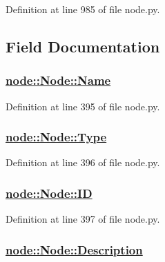 Definition at line 985 of file node.py.

\subsection{Field Documentation}
\hypertarget{classnode_1_1Node_b5fcb10e9efa5cebbd8a1b001ef0e936}{
\subsubsection[Name]{\setlength{\rightskip}{0pt plus 5cm}\hyperlink{classnode_1_1Node_b5fcb10e9efa5cebbd8a1b001ef0e936}{node::Node::Name}}}
\label{classnode_1_1Node_b5fcb10e9efa5cebbd8a1b001ef0e936}




Definition at line 395 of file node.py.\hypertarget{classnode_1_1Node_c0cf6b14fa5a80a5e19c4a2fd89a49ab}{
\subsubsection[Type]{\setlength{\rightskip}{0pt plus 5cm}\hyperlink{classnode_1_1Node_c0cf6b14fa5a80a5e19c4a2fd89a49ab}{node::Node::Type}}}
\label{classnode_1_1Node_c0cf6b14fa5a80a5e19c4a2fd89a49ab}




Definition at line 396 of file node.py.\hypertarget{classnode_1_1Node_a2e2c00f6b8eb25f09b4fce1878fb489}{
\subsubsection[ID]{\setlength{\rightskip}{0pt plus 5cm}\hyperlink{classnode_1_1Node_a2e2c00f6b8eb25f09b4fce1878fb489}{node::Node::ID}}}
\label{classnode_1_1Node_a2e2c00f6b8eb25f09b4fce1878fb489}




Definition at line 397 of file node.py.\hypertarget{classnode_1_1Node_877b512bfd8ceefecb5bc4a8355e01f0}{
\subsubsection[Description]{\setlength{\rightskip}{0pt plus 5cm}\hyperlink{classnode_1_1Node_877b512bfd8ceefecb5bc4a8355e01f0}{node::Node::Description}}}
\label{classnode_1_1Node_877b512bfd8ceefecb5bc4a8355e01f0}




